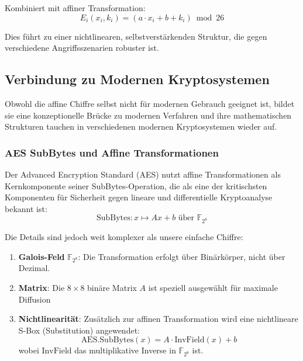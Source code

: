 ﻿\documentclass[12pt,a4paper]{article}
\begin{document}
	Kombiniert mit affiner Transformation:
	\begin{equation}
		E_i(x_i, k_i) = (a \cdot x_i + b + k_i) \bmod 26
	\end{equation}
	
	Dies führt zu einer nichtlinearen, selbstverstärkenden Struktur, die gegen verschiedene Angriffsszenarien robuster ist.
	
	
	\subsection{Verbindung zu Modernen Kryptosystemen}
	
	Obwohl die affine Chiffre selbst nicht für modernen Gebrauch geeignet ist, bildet sie eine konzeptionelle Brücke zu modernen Verfahren und ihre mathematischen Strukturen tauchen in verschiedenen modernen Kryptosystemen wieder auf.
	
	\subsubsection{AES SubBytes und Affine Transformationen}
	
	Der Advanced Encryption Standard (AES) nutzt affine Transformationen als Kernkomponente seiner SubBytes-Operation, die als eine der kritischsten Komponenten für Sicherheit gegen lineare und differentielle Kryptoanalyse bekannt ist:
	\begin{equation}
		\text{SubBytes}: x \mapsto Ax + b \text{ über } \mathbb{F}_{2^8}
	\end{equation}
	
	Die Details sind jedoch weit komplexer als unsere einfache Chiffre:
	\begin{enumerate}
		\item \textbf{Galois-Feld} $\mathbb{F}_{2^8}$: Die Transformation erfolgt über Binärkörper, nicht über Dezimal.
		\item \textbf{Matrix}: Die $8 \times 8$ binäre Matrix $A$ ist speziell ausgewählt für maximale Diffusion
		\item \textbf{Nichtlinearität}: Zusätzlich zur affinen Transformation wird eine nichtlineare S-Box (Substitution) angewendet:
		\begin{equation}
			\text{AES.SubBytes}(x) = A \cdot \text{InvField}(x) + b
		\end{equation}
		wobei $\text{InvField}$ das multiplikative Inverse in $\mathbb{F}_{2^8}$ ist.
	\end{enumerate}
	
\end{document}
